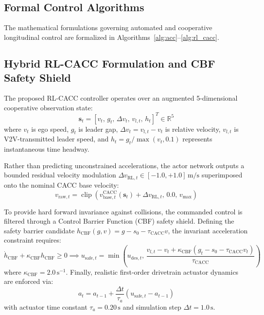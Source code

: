 \documentclass[11pt,a4paper]{article}
\begin{document}
\subsection{Formal Control Algorithms}
The mathematical formulations governing automated and cooperative longitudinal control are formalized in Algorithms~\ref{alg:acc}--\ref{alg:rl_cacc}.






\subsection{Hybrid RL-CACC Formulation and CBF Safety Shield}
The proposed RL-CACC controller operates over an augmented 5-dimensional cooperative observation state:
\begin{equation}
\mathbf{s}_t = \left[ v_t,\, g_t,\, \Delta v_t,\, v_{l,t},\, h_t \right]^T \in \mathbb{R}^5
\end{equation}
where $v_t$ is ego speed, $g_t$ is leader gap, $\Delta v_t = v_{l,t} - v_t$ is relative velocity, $v_{l,t}$ is V2V-transmitted leader speed, and $h_t = g_t / \max(v_t, 0.1)$ represents instantaneous time headway.

Rather than predicting unconstrained accelerations, the actor network outputs a bounded residual velocity modulation $\Delta v_{\text{RL},t} \in [-1.0, +1.0]\,\mathrm{m/s}$ superimposed onto the nominal CACC base velocity:
\begin{equation}
v_{\text{raw},t} = \operatorname{clip}\left( v_{\text{base},t}^{\text{CACC}}(\mathbf{s}_t) + \Delta v_{\text{RL},t},\, 0.0,\, v_{\max} \right)
\end{equation}

To provide hard forward invariance against collisions, the commanded control is filtered through a Control Barrier Function (CBF) safety shield. Defining the safety barrier candidate $h_{\text{CBF}}(g, v) = g - s_{0} - \tau_{\text{CACC}} v$, the invariant acceleration constraint requires:
\begin{equation}
\dot{h}_{\text{CBF}} + \kappa_{\text{CBF}} h_{\text{CBF}} \ge 0 \implies u_{\text{safe},t} = \min\left( u_{\text{des},t},\, \frac{v_{l,t} - v_t + \kappa_{\text{CBF}}(g_t - s_0 - \tau_{\text{CACC}} v_t)}{\tau_{\text{CACC}}} \right)
\end{equation}
where $\kappa_{\text{CBF}} = 2.0\,\mathrm{s}^{-1}$. Finally, realistic first-order drivetrain actuator dynamics are enforced via:
\begin{equation}
a_t = a_{t-1} + \frac{\Delta t}{\tau_a} \left( u_{\text{safe},t} - a_{t-1} \right)
\end{equation}
with actuator time constant $\tau_a = 0.20\,\mathrm{s}$ and simulation step $\Delta t = 1.0\,\mathrm{s}$.
\end{document}
